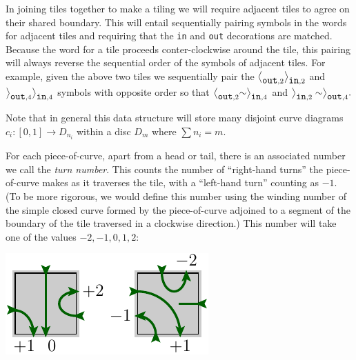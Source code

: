 \documentclass[aps, prl, letterpaper, twocolumn, superscriptaddress, notitlepage, 10pt]{revtex4-1}
\begin{document}
In joining tiles together to make a tiling we will
require adjacent tiles to agree on their shared boundary.
This will entail sequentially pairing symbols in the
words for adjacent tiles
and requiring that 
the {\tt in} and {\tt out} decorations are matched.
Because the word for a tile proceeds conter-clockwise
around the tile, this pairing will always reverse the
sequential order of the symbols of adjacent tiles.
For example, given the above two tiles we sequentially pair the 
$\bigl<_{\mbox{\tt out},2}\bigr>_{\mbox{\tt in},2}$ 
and $\bigr>_{\mbox{\tt out},4}\bigr>_{\mbox{\tt in},4}$
symbols with opposite order so that
$\bigl<_{\mbox{\tt out},2}\sim\bigr>_{\mbox{\tt in},4}$
and $\bigr>_{\mbox{\tt in},2} \sim \bigr>_{\mbox{\tt out},4}.$ 


Note that in general this data structure will store many disjoint curve diagrams
$c_i:[0,1]\to D_{n_i}$ within a disc $D_m$ where $\sum n_i = m.$


For each piece-of-curve, apart from a head or tail, there is an associated 
number we call the \emph{turn number}. This counts the number
of ``right-hand turns'' the piece-of-curve makes as it
traverses the tile, with a ``left-hand turn'' counting as $-1.$
(To be more rigorous, we would define this number using the
winding number of the simple closed curve formed by the
piece-of-curve adjoined to a segment of the boundary of the tile 
traversed in a clockwise direction.)
This number will take one of the values $-2, -1, 0, 1, 2:$
\begin{center}
\includegraphics[]{pic-cells-3.pdf}
\end{center}
\end{document}
